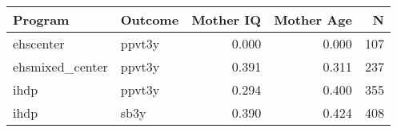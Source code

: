 \begin{table}[ht]
\centering
\begin{tabular}{llrrr}
  \hline
Program & Outcome & Mother IQ & Mother Age & N \\ 
  \hline
ehscenter & ppvt3y & 0.000 & 0.000 & 107 \\ 
  ehsmixed\_center & ppvt3y & 0.391 & 0.311 & 237 \\ 
  ihdp & ppvt3y & 0.294 & 0.400 & 355 \\ 
  ihdp & sb3y & 0.390 & 0.424 & 408 \\ 
   \hline
\end{tabular}
\end{table}
